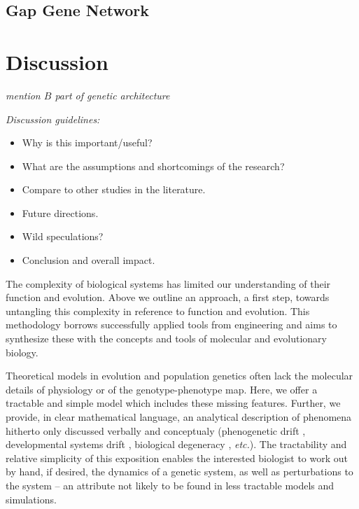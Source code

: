 \documentclass[9 pt]{article}
\newcommand{\plr}[1]{{\color{blue}\it #1}}
\newcommand{\jss}[1]{{\color{olive}\it #1}}
\newcommand{\1}{\mathbbm{1}}
\begin{document}
    \subsection*{Gap Gene Network}

    \section*{Discussion}
      \plr{mention $B$ part of genetic architecture}

      \jss{Discussion guidelines:
        \begin{itemize}
        \item Why is this important/useful?
        \item What are the assumptions and shortcomings of the research?
        \item Compare to other studies in the literature. 
        \item Future directions. 
        \item Wild speculations?
        \item Conclusion and overall impact. 
      \end{itemize}}

  The complexity of biological systems has limited our understanding of their function and evolution. Above we outline an approach, a first step, towards untangling this complexity in reference to function and evolution. This methodology borrows successfully applied tools from engineering and aims to synthesize these with the concepts and tools of molecular and evolutionary biology. 
  
  Theoretical models in evolution and population genetics often lack the molecular details of physiology or of the genotype-phenotype map. Here, we offer a tractable and simple model which includes these missing features. Further, we provide, in clear mathematical language, an analytical description of phenomena hitherto only discussed verbally and conceptualy (phenogenetic drift \citep{weiss2000phenogenetic}, developmental systems drift \citep{true2001developmental}, biological degeneracy \citep{edelman2001degeneracy}, \emph{etc.}). The tractability and relative simplicity of this exposition enables the interested biologist to work out by hand, if desired, the dynamics of a genetic system, as well as perturbations to the system -- an attribute not likely to be found in less tractable models and simulations.
\end{document}
